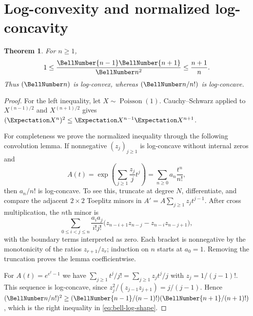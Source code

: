\documentclass[11pt,a4paper,oneside,openany]{book}
\newtheorem{theorem}{Theorem}[chapter]
\theoremstyle{definition}
\theoremstyle{remark}
\begin{document}
\section{Log-convexity and normalized log-concavity}
\begin{theorem}\label{thm:bell-log-shape}
For $n\ge1$,
\begin{equation}\label{eq:bell-log-shape}
 1\le \frac{\BellNumber{n-1}\BellNumber{n+1}}{\BellNumber n^2}\le\frac{n+1}{n}.
\end{equation}
Thus $(\BellNumber n)$ is log-convex, whereas $(\BellNumber n/n!)$ is log-concave.
\end{theorem}
\begin{proof}
For the left inequality, let $X\sim\operatorname{Poisson}(1)$.  Cauchy--Schwarz
applied to $X^{(n-1)/2}$ and $X^{(n+1)/2}$ gives
$(\Expectation X^n)^2\le \Expectation X^{n-1}\Expectation X^{n+1}$.

For completeness we prove the normalized inequality through the following
convolution lemma.  If nonnegative $(z_j)_{j\ge1}$ is log-concave without internal
zeros and
\[
 A(t)=\exp\!\left(\sum_{j\ge1}\frac{z_j}{j}t^j\right)
      =\sum_{n\ge0}a_n\frac{t^n}{n!},
\]
then $a_n/n!$ is log-concave.  To see this, truncate at degree $N$, differentiate,
and compare the adjacent $2\times2$ Toeplitz minors in
$A'=A\sum_{j\ge1}z_jt^{j-1}$.  After cross multiplication, the $n$th minor is
\[
 \sum_{0\le i<j\le n}
 \frac{a_i a_j}{i!j!}
 \bigl(z_{n-i+1}z_{n-j}-z_{n-i}z_{n-j+1}\bigr),
\]
with the boundary terms interpreted as zero.  Each bracket is nonnegative by the
monotonicity of the ratios $z_{r+1}/z_r$; induction on $n$ starts at $a_0=1$.
Removing the truncation proves the lemma coefficientwise.

For $A(t)=e^{e^t-1}$ we have
$\sum_{j\ge1}t^j/j!=\sum_{j\ge1}z_jt^j/j$ with
$z_j=1/(j-1)!$.  This sequence is log-concave, since
$z_j^2/(z_{j-1}z_{j+1})=j/(j-1)$.  Hence
$(\BellNumber n/n!)^2\ge(\BellNumber{n-1}/(n-1)!)(\BellNumber{n+1}/(n+1)!)$, which is the right
inequality in \eqref{eq:bell-log-shape}.
\end{proof}
\end{document}
